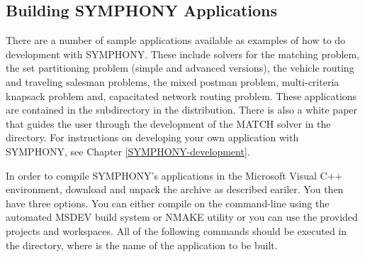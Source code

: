 \subsection{Building SYMPHONY Applications}

There are a number of sample applications available as examples of how to do
development with SYMPHONY. These include solvers for the matching problem, the
set partitioning problem (simple and advanced versions), the vehicle routing
and traveling salesman problems, the mixed postman problem, multi-criteria
knapsack problem and, capacitated network routing problem. These applications
are contained in the  subdirectory in the
distribution. There is also a white paper that guides the user through the
development of the MATCH solver in the  directory. For
instructions on developing your own application with SYMPHONY, see Chapter
\ref{SYMPHONY-development}.

In order to compile SYMPHONY's applications in the Microsoft Visual C++
environment, download  and unpack the archive as
described eariler. You then have three options. You can either compile on the
command-line using the automated MSDEV build system or NMAKE utility or you
can use the provided projects and workspaces. All of the following commands
should be executed in the  directory, where  is the name of the application to be built.

